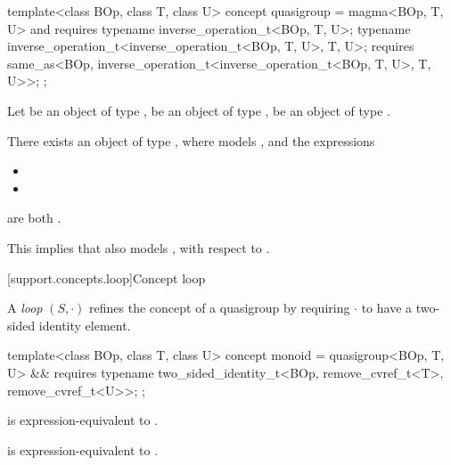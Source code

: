 \begin{itemdecl}
  template<class BOp, class T, class U>
  concept quasigroup = magma<BOp, T, U> and requires {
     typename inverse_operation_t<BOp, T, U>;
     typename inverse_operation_t<inverse_operation_t<BOp, T, U>, T, U>;
     requires same_as<BOp, inverse_operation_t<inverse_operation_t<BOp, T, U>, T, U>>;
  };
\end{itemdecl}
\begin{itemdescr}
   \pnum
   Let  be an object of type ,  be an object of type ,
    be an object of type .

   \pnum
   There exists an object  of type , where  models
   , and the expressions
   \begin{itemize}
      \item {}
      \item {}
   \end{itemize}
   are both .
   \begin{note}
      This implies that  also models , with respect to
      .
   \end{note}
\end{itemdescr}


[support.concepts.loop]{Concept loop}

\pnum
A \textit{loop} $(S, \cdot)$ refines the concept of a quasigroup by requiring $\cdot$ to have a
two-sided identity element.

\begin{itemdecl}
  template<class BOp, class T, class U>
  concept monoid = quasigroup<BOp, T, U> && requires {
    typename two_sided_identity_t<BOp, remove_cvref_t<T>, remove_cvref_t<U>>;
  };
\end{itemdecl}
\begin{itemdescr}
   \pnum
    is expression-equivalent to
   .

   \pnum
    is expression-equivalent to
   .
\end{itemdescr}

